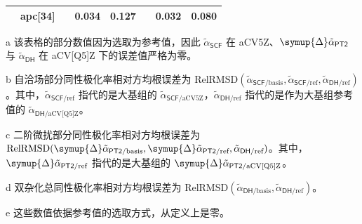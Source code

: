\begin{table}[!ht]
{\begin{tabular}{cld{1.3}d{1.3}d{1.3}d{1.3}d{1.3}d{1.3}}
              & apc[34]  &       & 0.034 & 0.127 &       & 0.032 & 0.080 \\
    \bottomrule
    \end{tabular}
}{
    \item[a] 该表格的部分数值因为选取为参考值，因此 $\tilde \alpha_\textsf{SCF}$ 在 aCV5Z、$\symup{\Delta} \tilde \alpha_\textsf{PT2}$ 与 $\tilde \alpha_\textsf{DH}$ 在 aCV[Q5]Z 下的误差值严格为零。
    \item[b] 自洽场部分同性极化率相对方均根误差为 $\text{RelRMSD} (\tilde \alpha_{\textsf{SCF}/\text{basis}}, \tilde \alpha_{\textsf{SCF}/\text{ref}}, \tilde \alpha_{\textsf{DH}/\text{ref}})$。其中，$\tilde \alpha_{\textsf{SCF}/\text{ref}}$ 指代的是大基组的 $\tilde \alpha_{\textsf{SCF}/\text{aCV5Z}}$，$\tilde \alpha_{\textsf{DH}/\text{ref}}$ 指代的是作为大基组参考值的 $\tilde \alpha_{\textsf{DH}/\text{aCV[Q5]Z}}$。
    \item[c] 二阶微扰部分同性极化率相对方均根误差为 $\text{RelRMSD} (\symup{\Delta} \tilde \alpha_{\textsf{PT2}/\text{basis}}, \symup{\Delta} \tilde \alpha_{\textsf{PT2}/\text{ref}}, \tilde \alpha_{\textsf{DH}/\text{ref}})$。其中，$\symup{\Delta} \tilde \alpha_{\textsf{PT2}/\text{ref}}$ 指代的是大基组的 $\symup{\Delta} \tilde \alpha_{\textsf{PT2}/\text{aCV[Q5]Z}}$。
    \item[d] 双杂化总同性极化率相对方均根误差为 $\text{RelRMSD} (\tilde \alpha_{\textsf{DH}/\text{basis}}, \tilde \alpha_{\textsf{DH}/\text{ref}})$。
    \item[e] 这些数值依据参考值的选取方式，从定义上是零。
}
\end{table}

